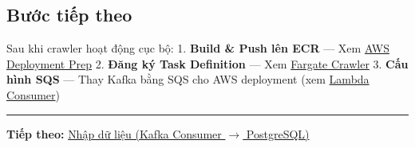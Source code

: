 \hypertarget{bux1b0ux1edbc-tiux1ebfp-theo}{%
\subsection{Bước tiếp theo}}

Sau khi crawler hoạt động cục bộ: 1. \textbf{Build \& Push lên ECR} ---
Xem \href{5.9-AWS-Deploy/}{AWS Deployment Prep} 2. \textbf{Đăng ký Task
Definition} --- Xem \href{5.10-Fargate-Crawler/}{Fargate Crawler} 3.
\textbf{Cấu hình SQS} --- Thay Kafka bằng SQS cho AWS deployment (xem
\href{5.11-Lambda-Consumer/}{Lambda Consumer})

\begin{center}\rule{0.5\linewidth}{0.5pt}\end{center}

\textbf{Tiếp theo:} \href{5.6-Ingestion/}{Nhập dữ liệu (Kafka Consumer
\(\rightarrow\) PostgreSQL)}
